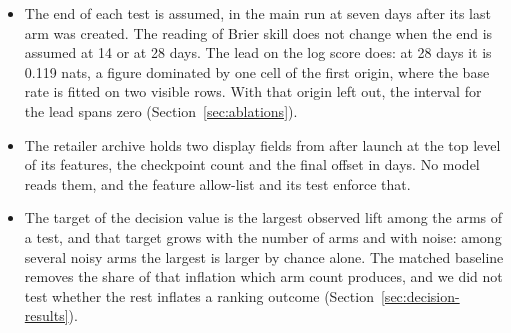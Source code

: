 \begin{itemize}
\item The end of each test is assumed, in the main run at seven days after its last arm was created. The reading of Brier skill does not change when the end is assumed at 14 or at 28 days. The lead on the log score does: at 28 days it is 0.119 nats, a figure dominated by one cell of the first origin, where the base rate is fitted on two visible rows. With that origin left out, the interval for the lead spans zero (Section~\ref{sec:ablations}).
\item The retailer archive holds two display fields from after launch at the top level of its features, the checkpoint count and the final offset in days. No model reads them, and the feature allow-list and its test enforce that.
\item The target of the decision value is the largest observed lift among the arms of a test, and that target grows with the number of arms and with noise: among several noisy arms the largest is larger by chance alone. The matched baseline removes the share of that inflation which arm count produces, and we did not test whether the rest inflates a ranking outcome (Section~\ref{sec:decision-results}).
\end{itemize}

